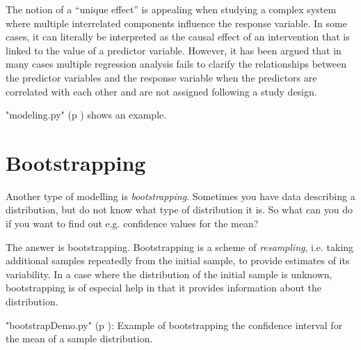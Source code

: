 The notion of a “unique effect” is appealing when studying a complex system where multiple interrelated components influence the response variable. In some cases, it can literally be interpreted as the causal effect of an intervention that is linked to the value of a predictor variable. However, it has been argued that in many cases multiple regression analysis fails to clarify the relationships between the predictor variables and the response variable when the predictors are correlated with each other and are not assigned following a study design.

\PyImg "modeling.py" (p \pageref{py:modeling}) shows an example.

\section{Bootstrapping} 

Another type of modelling is \emph{bootstrapping}. Sometimes you have data describing a distribution, but do not know what type of distribution it is. So what can you do if you want to find out e.g. confidence values for the mean?

The answer is bootstrapping. Bootstrapping is a scheme of \emph{resampling}, i.e. taking additional samples repeatedly from the initial sample, to provide estimates of its variability. In a case where the distribution of the initial sample is unknown, bootstrapping is of especial help in that it provides information about the distribution.

\PyImg "bootstrapDemo.py" (p \pageref{py:bootstrapDemo}): Example of bootstrapping the confidence interval for the mean of a sample distribution.

